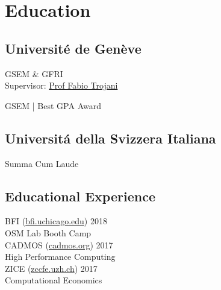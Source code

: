 \documentclass[]{deedy-resume-openfont}
\begin{document}
%
%
\lastupdated

%
%



%
%

\begin{minipage}[t]{0.33\textwidth} 


\section{Education} 

\subsection{Universit\'e de Gen\`eve}
GSEM \& GFRI \\
Supervisor: \href{http://www.people.usi.ch/trojanif/}{Prof Fabio Trojani} \\
\sectionsep

GSEM | Best GPA Award \\
\sectionsep

\subsection{Universit\'a della Svizzera Italiana}
Summa Cum Laude
\sectionsep

\subsection{Educational Experience}
\textbullet{} BFI (\href{https://bfi.uchicago.edu/osm18}{bfi.uchicago.edu}) 2018 \\
OSM Lab Booth Camp \\
\textbullet{} CADMOS (\href{http://cadmos.org/index.php/fr/}{cadmos.org}) 2017 \\
High Performance Computing \\
\textbullet{} ZICE (\href{http://zccfe.uzh.ch/en/}{zccfe.uzh.ch}) 2017 \\
Computational Economics 
\sectionsep


\end{minipage}
\end{document}
